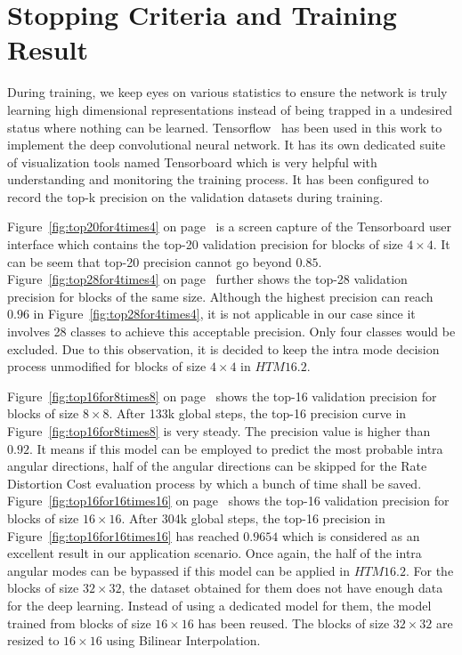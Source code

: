 \section{Stopping Criteria and Training Result}\label{sec:training}
During training, we keep eyes on 
various statistics to ensure the network is
truly learning high dimensional representations 
instead of being trapped
in a undesired status where nothing can be
learned.
Tensorflow~\parencite{tensorflow2015-whitepaper} has 
been used in this work to implement the 
deep convolutional neural network.
It has its own dedicated suite of visualization
tools named Tensorboard which is very helpful 
with understanding and monitoring the training process.
It has been configured to record the top-k precision
on the validation datasets during training.

Figure~\ref{fig:top20for4times4} 
on page~\pageref{fig:top20for4times4}
is a screen capture
of the Tensorboard user interface which contains the 
top-20 validation precision for blocks of size \(4\times4\).
It can be seem that top-20 precision cannot go 
beyond \(0.85\).
Figure~\ref{fig:top28for4times4}
on page~\pageref{fig:top28for4times4}
further shows the 
top-28 validation precision for blocks of the same size.
Although the highest precision can reach \(0.96\) 
in Figure~\ref{fig:top28for4times4}, it is not applicable
in our case since it involves 28 classes to achieve this 
acceptable precision.
Only four classes would be excluded.
Due to this observation, it is decided to
keep the intra mode decision process unmodified for 
blocks of size \(4\times4\) in \(HTM16.2\).

Figure~\ref{fig:top16for8times8}
on page~\pageref{fig:top16for8times8}
shows the 
top-16 validation precision for blocks of size \(8\times8\).
After 133k global steps, the top-16 precision curve in 
Figure~\ref{fig:top16for8times8} is very steady.
The precision value is higher than \(0.92\).
It means if this model can be employed to predict the 
most probable intra angular directions,
half of the angular directions can be skipped for
the Rate Distortion Cost evaluation process by which
a bunch of time shall be saved.
Figure~\ref{fig:top16for16times16} 
on page~\pageref{fig:top16for16times16}
shows the
top-16 validation precision for blocks 
of size \(16\times16\).
After 304k global steps, the top-16 precision in
Figure~\ref{fig:top16for16times16} has reached
\(0.9654\) which is considered as an excellent
result in our application scenario.
Once again, the half of the intra angular modes
can be bypassed if this model can be applied 
in \(HTM16.2\).
For the blocks of size \(32\times32\),
the dataset obtained for them does not 
have enough data
for the deep learning.
Instead of using a dedicated model for them,
the model trained from blocks of 
size \(16\times16\) has been reused.
The blocks of size \(32\times32\) are resized
to \(16\times16\) using Bilinear Interpolation.


